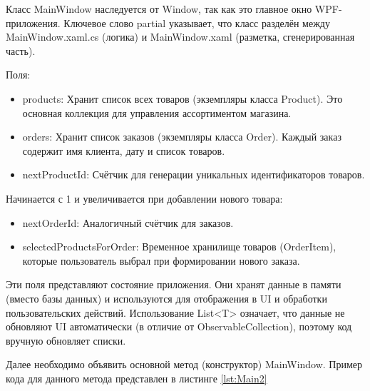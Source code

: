 \documentclass[12pt]{article}
\newcommand{\colorGIT}[1]{\textcolor{CtpLavender}{#1}}
\renewcommand{\texttt}[1]{{\small\ttfamily #1}}
\newenvironment{code}
  {\par\captionsetup{type=listing}\noindent}
  {\par\vspace{\baselineskip}}
\numberwithin{listing}{section}
\numberwithin{figure}{section}
\begin{document}
\begin{code}
	\inputminted[firstline=1, lastline=21]{csharp}{../3lab/StoreManager/MainWindow.xaml.cs}
	\caption{Пример кода для класса \colorGIT{\href{https://github.com/WebMasterIT/Csharp_Labs/blob/ec375afd16c0647b337cf3d8a79c8bef904fc1be/3lab/StoreManager/MainWindow.xaml.cs\#L1-L21}{MainWindow}}}
	\label{lst:Main}
\end{code}

Класс \texttt{MainWindow} наследуется от \texttt{Window}, так как это главное окно \texttt{WPF}-приложения. Ключевое слово \texttt{partial} указывает, что класс разделён между \texttt{MainWindow.xaml.cs} (логика) и \texttt{MainWindow\-.xaml} (разметка, сгенерированная часть).

\noindent Поля:
\begin{itemize}
	\item \texttt{products}: Хранит список всех товаров (экземпляры класса \texttt{Product}). Это основная коллекция для управления ассортиментом магазина.
	\item \texttt{orders}: Хранит список заказов (экземпляры класса \texttt{Order}). Каждый заказ содержит имя клиента, дату и список товаров.
	\item \texttt{nextProductId}: Счётчик для генерации уникальных идентификаторов товаров.
\end{itemize}

\noindent Начинается с 1 и увеличивается при добавлении нового товара:
\begin{itemize}
	\item \texttt{nextOrderId}: Аналогичный счётчик для заказов.
	\item \texttt{selectedProductsForOrder}: Временное хранилище товаров (\texttt{OrderItem}), которые пользователь выбрал при формировании нового заказа.
\end{itemize}

Эти поля представляют состояние приложения. Они хранят данные в памяти (вместо базы данных) и используются для отображения в \texttt{UI} и обработки пользовательских действий. Использование \texttt{List<T>} означает, что данные не обновляют \texttt{UI} автоматически (в отличие от \texttt{Observable\-Collection}), поэтому код вручную обновляет списки.

{}
Далее необходимо объявить основной метод (конструктор) \texttt{MainWindow}.
Пример кода для данного метода представлен в листинге \ref{lst:Main2}
\end{document}
